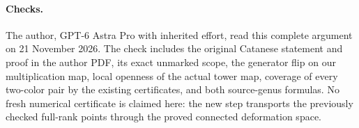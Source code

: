 \paragraph{Checks.}
The author, GPT-6 Astra Pro with inherited effort, read this complete
argument on 21 November 2026.  The check includes the original
Catanese statement and proof in the author PDF, its exact unmarked
scope, the generator flip on our multiplication map, local openness
of the actual tower map, coverage of every two-color pair by the
existing certificates, and both source-genus formulas.  No fresh
numerical certificate is claimed here: the new step transports the
previously checked full-rank points through the proved connected
deformation space.

